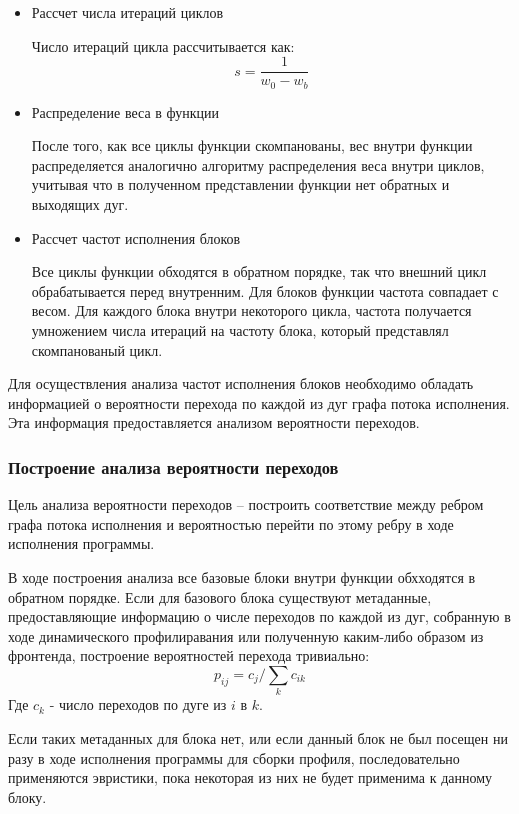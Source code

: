 \begin{itemize}
    \item{Рассчет числа итераций циклов}

        Число итераций цикла рассчитывается как:
        $$ s = \frac{1}{w_0 - w_b} $$

    \item{Распределение веса в функции}

        После того, как все циклы функции скомпанованы, вес внутри функции распределяется аналогично алгоритму распределения веса внутри циклов, учитывая что в полученном представлении функции нет обратных и выходящих дуг.

    \item{Рассчет частот исполнения блоков}

        Все циклы функции обходятся в обратном порядке, так что внешний цикл обрабатывается перед внутренним.
        Для блоков функции частота совпадает с весом.
        Для каждого блока внутри некоторого цикла, частота получается умножением числа итераций на частоту блока, который представлял скомпанованый цикл.

\end{itemize}

Для осуществления анализа частот исполнения блоков необходимо обладать информацией о вероятности перехода по каждой из дуг графа потока исполнения.
Эта информация предоставляется анализом вероятности переходов.

\subsubsection{Построение анализа вероятности переходов}

Цель анализа вероятности переходов -- построить соответствие между ребром графа потока исполнения и вероятностью перейти по этому ребру в ходе исполнения программы.

В ходе построения  анализа все базовые блоки внутри функции обхходятся в обратном порядке.
Если для базового блока существуют метаданные, предоставляющие информацию о числе переходов по каждой из дуг, собранную в ходе динамического профилиравания или полученную каким-либо образом из фронтенда, построение вероятностей перехода тривиально:
$$ p_{ij} = c_{j} / \sum_k{c_{ik}} $$
Где $c_k$ - число переходов по дуге из $i$ в $k$.

Если таких метаданных для блока нет, или если данный блок не был посещен ни разу в ходе исполнения программы для сборки профиля, последовательно применяются эвристики, пока некоторая из них не будет применима к данному блоку.

